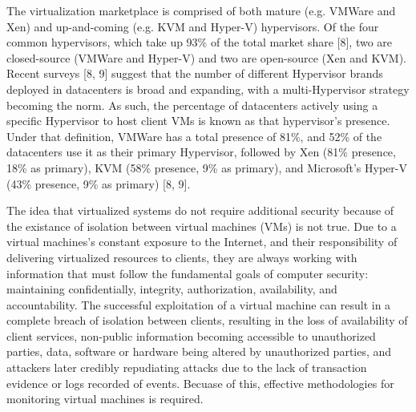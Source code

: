 \documentclass{report}
\begin{document}
\begin{spacing}{1.5}
{\large
The virtualization marketplace is comprised of both mature (e.g. VMWare and Xen) and up-and-coming (e.g. KVM
and Hyper-V) hypervisors. Of the four common hypervisors, which take up 93\% of the total market share [8], two are closed-source (VMWare and Hyper-V) and two are open-source (Xen and KVM). Recent surveys [8, 9] suggest that the number of different Hypervisor brands deployed in datacenters is broad and expanding, with a multi-Hypervisor strategy becoming the norm. As such, the percentage of datacenters actively using a specific Hypervisor to host client VMs is known as that hypervisor’s presence. Under that definition, VMWare has a total presence of 81\%, and 52\% of the datacenters use it as their primary Hypervisor, followed by Xen (81\% presence, 18\% as primary), KVM (58\% presence, 9\% as primary), and Microsoft’s Hyper-V (43\%
presence, 9\% as primary) [8, 9].
\newline
}

{\large 
The idea that virtualized systems do not require additional security because of the existance of isolation between virtual machines (VMs) is not true. Due to a virtual machines's constant exposure to the Internet, and their responsibility of delivering virtualized resources to clients, they are always working with information that must follow the fundamental goals of computer security: maintaining confidentially, integrity, authorization, availability, and accountability. The successful exploitation of a virtual machine can result in a complete breach of isolation between clients, resulting in the loss of availability of client services, non-public information becoming accessible to unauthorized parties, data, software or hardware being altered by unauthorized parties, and attackers later credibly repudiating attacks due to the lack of transaction evidence or logs recorded of events. Becuase of this, effective methodologies for monitoring virtual machines is required.
\newline
}


\end{spacing}
\end{document}
